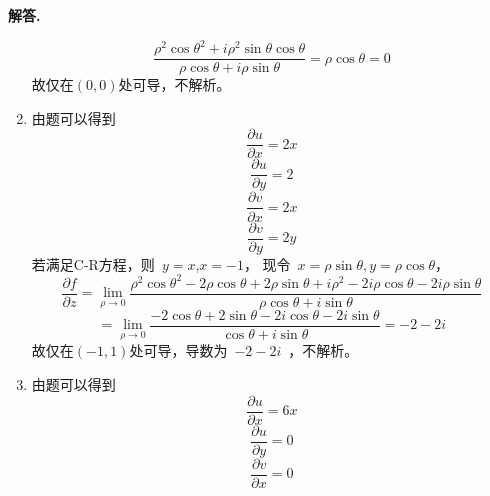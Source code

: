\documentclass[11pt]{ctexart}
\newenvironment{solution}{\par\noindent\textbf{解答. }}{\par}
\begin{document}
\begin{solution}
\begin{enumerate}[(1)]
\begin{equation*}
                  \dfrac{\rho^2\cos{\theta}^2+i\rho^2\sin{\theta}\cos{\theta}}{\rho\cos{\theta}+i\rho\sin{\theta}}=\rho\cos{\theta}=0
              \end{equation*}
              故仅在$(0,0)$处可导，不解析。
        \item 由题可以得到
              \begin{equation*}
                  \dfrac{\partial u}{\partial x} = 2x
              \end{equation*}
              \begin{equation*}
                  \dfrac{\partial u}{\partial y} = 2
              \end{equation*}
              \begin{equation*}
                  \dfrac{\partial v}{\partial x} = 2x
              \end{equation*}
              \begin{equation*}
                  \dfrac{\partial v}{\partial y} = 2y
              \end{equation*}
              若满足C-R方程，则\ $y=x$,$x=-1$，
              现令\ $x=\rho\sin{\theta},y=\rho\cos{\theta}$，
              \begin{equation*}
                  \dfrac{\partial f}{\partial z} = \lim\limits_{\rho\to 0}\dfrac{\rho^2\cos{\theta}^2-2\rho\cos{\theta}+2\rho\sin{\theta}+i\rho^2-2i\rho\cos{\theta}-2i\rho\sin{\theta}}{\rho\cos{\theta}+i\sin{\theta}} 
              \end{equation*}
              \begin{equation*}
                  = \lim\limits_{\rho\to 0}\dfrac{-2\cos{\theta}+2\sin{\theta}-2i\cos{\theta}-2i\sin{\theta}}{\cos{\theta}+i\sin{\theta}}
                  = -2 - 2i
              \end{equation*}
              故仅在$(-1,1)$处可导，导数为\ $-2-2i$\ ，不解析。
        \item 由题可以得到
              \begin{equation*}
                  \dfrac{\partial u}{\partial x} = 6x
              \end{equation*}
              \begin{equation*}
                  \dfrac{\partial u}{\partial y} = 0
              \end{equation*}
              \begin{equation*}
                  \dfrac{\partial v}{\partial x} = 0
              \end{equation*}
              \begin{equation*}

\end{equation*}
\end{enumerate}
\end{solution}
\end{document}
